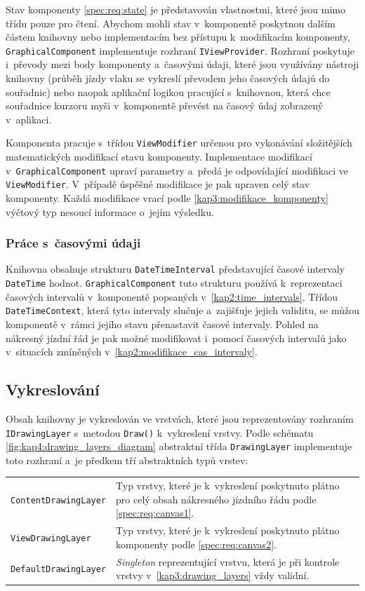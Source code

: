 \newpage
Stav komponenty \ref{spec:req:state} je představován vlastnostmi, které jsou mimo třídu pouze pro čtení. Abychom mohli stav v~komponentě poskytnou dalším částem knihovny nebo implementacím bez přístupu k~modifikacím komponenty, \linebreak\texttt{GraphicalComponent} implementuje rozhraní \texttt{IViewProvider}. Rozhraní poskytuje i~převody mezi body komponenty a~časovými údaji, které jsou využívány nástroji knihovny (průběh jízdy vlaku se vykreslí převodem jeho časových údajů do souřadnic) nebo naopak aplikační logikou pracující s~knihovnou, která chce souřadnice kurzoru myši v~komponentě převést na časový údaj zobrazený v~aplikaci.

Komponenta pracuje s~třídou \texttt{ViewModifier} určenou pro vykonávání složitějších matematických modifikací stavu komponenty. Implementace modifikací v~\texttt{GraphicalComponent} upraví parametry a~předá je odpovídající modifikaci ve \texttt{ViewModifier}. V~případě úspěšné modifikace je pak upraven celý stav komponenty. Každá modifikace vrací podle \ref{kap3:modifikace_komponenty} výčtový typ nesoucí informace
o~jejím výsledku.

\subsubsection*{Práce s~časovými údaji}
Knihovna obsahuje strukturu \texttt{DateTimeInterval} představující časové intervaly \texttt{DateTime} hodnot. \texttt{GraphicalComponent} tuto strukturu používá k~reprezentaci časových intervalů v~komponentě popsaných v~\ref{kap2:time_intervals}. Třídou \texttt{DateTimeContext}, která tyto intervaly slučuje a~zajišťuje jejich validitu, se můžou komponentě v~rámci jejího stavu přenastavit časové intervaly. Pohled na nákresný jízdní řád je pak možné modifikovat i~pomocí časových intervalů jako v~situacích zmíněných v~\ref{kap2:modifikace_cas_intervaly}.

\subsection{Vykreslování}
Obsah knihovny je vykreslován ve vrstvách, které jsou reprezentovány rozhraním \texttt{IDrawingLayer} s~metodou \texttt{Draw()} k~vykreslení vrstvy. Podle schématu \ref{fig:kap4:drawing_layers_diagram} abstraktní třída \texttt{DrawingLayer} implementuje toto rozhraní a~je předkem tří abstraktních typů vrstev:

\hskip-1.0cm
\begin{tabular}{ m{} m{} }
\texttt{ContentDrawingLayer} & Typ vrstvy, které je k~vykreslení poskytnuto plátno pro celý obsah nákresného jízdního řádu podle \ref{spec:req:canvas1}. \\
\texttt{ViewDrawingLayer} & Typ vrstvy, které je k~vykreslení poskytnuto plátno komponenty podle \ref{spec:req:canvas2}. \\ 
\texttt{DefaultDrawingLayer} & \textit{Singleton} reprezentující vrstvu, která je při kontrole vrstvy v~\ref{kap3:drawing_layers} vždy validní.
\end{tabular}

